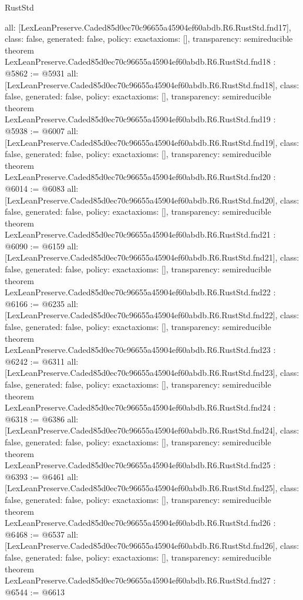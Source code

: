 \begin{lexlean}{RustStd}
\begin{coremodule}
{  all: [LexLeanPreserve.Caded85d0ec70c96655a45904ef60abdb.R6.RustStd.fnd17],
  class: false,
  generated: false,
  policy: exact{axioms: []},
  transparency: semireducible
}
theorem LexLeanPreserve.Caded85d0ec70c96655a45904ef60abdb.R6.RustStd.fnd18 : @5862 := @5931 {
  all: [LexLeanPreserve.Caded85d0ec70c96655a45904ef60abdb.R6.RustStd.fnd18],
  class: false,
  generated: false,
  policy: exact{axioms: []},
  transparency: semireducible
}
theorem LexLeanPreserve.Caded85d0ec70c96655a45904ef60abdb.R6.RustStd.fnd19 : @5938 := @6007 {
  all: [LexLeanPreserve.Caded85d0ec70c96655a45904ef60abdb.R6.RustStd.fnd19],
  class: false,
  generated: false,
  policy: exact{axioms: []},
  transparency: semireducible
}
theorem LexLeanPreserve.Caded85d0ec70c96655a45904ef60abdb.R6.RustStd.fnd20 : @6014 := @6083 {
  all: [LexLeanPreserve.Caded85d0ec70c96655a45904ef60abdb.R6.RustStd.fnd20],
  class: false,
  generated: false,
  policy: exact{axioms: []},
  transparency: semireducible
}
theorem LexLeanPreserve.Caded85d0ec70c96655a45904ef60abdb.R6.RustStd.fnd21 : @6090 := @6159 {
  all: [LexLeanPreserve.Caded85d0ec70c96655a45904ef60abdb.R6.RustStd.fnd21],
  class: false,
  generated: false,
  policy: exact{axioms: []},
  transparency: semireducible
}
theorem LexLeanPreserve.Caded85d0ec70c96655a45904ef60abdb.R6.RustStd.fnd22 : @6166 := @6235 {
  all: [LexLeanPreserve.Caded85d0ec70c96655a45904ef60abdb.R6.RustStd.fnd22],
  class: false,
  generated: false,
  policy: exact{axioms: []},
  transparency: semireducible
}
theorem LexLeanPreserve.Caded85d0ec70c96655a45904ef60abdb.R6.RustStd.fnd23 : @6242 := @6311 {
  all: [LexLeanPreserve.Caded85d0ec70c96655a45904ef60abdb.R6.RustStd.fnd23],
  class: false,
  generated: false,
  policy: exact{axioms: []},
  transparency: semireducible
}
theorem LexLeanPreserve.Caded85d0ec70c96655a45904ef60abdb.R6.RustStd.fnd24 : @6318 := @6386 {
  all: [LexLeanPreserve.Caded85d0ec70c96655a45904ef60abdb.R6.RustStd.fnd24],
  class: false,
  generated: false,
  policy: exact{axioms: []},
  transparency: semireducible
}
theorem LexLeanPreserve.Caded85d0ec70c96655a45904ef60abdb.R6.RustStd.fnd25 : @6393 := @6461 {
  all: [LexLeanPreserve.Caded85d0ec70c96655a45904ef60abdb.R6.RustStd.fnd25],
  class: false,
  generated: false,
  policy: exact{axioms: []},
  transparency: semireducible
}
theorem LexLeanPreserve.Caded85d0ec70c96655a45904ef60abdb.R6.RustStd.fnd26 : @6468 := @6537 {
  all: [LexLeanPreserve.Caded85d0ec70c96655a45904ef60abdb.R6.RustStd.fnd26],
  class: false,
  generated: false,
  policy: exact{axioms: []},
  transparency: semireducible
}
theorem LexLeanPreserve.Caded85d0ec70c96655a45904ef60abdb.R6.RustStd.fnd27 : @6544 := @6613 {
}
\end{coremodule}
\end{lexlean}

